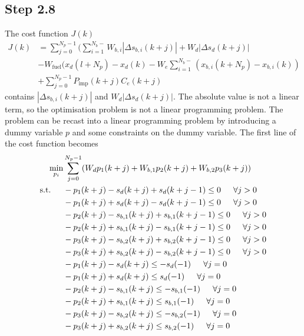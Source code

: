 \subsection*{Step 2.8}
The cost function $J(k)$ 
\begin{align*}
    J(k) &= \sum^{N_p-1}_{j=0} ( \sum^{N_b-}_{i=1}W_{b,i}|\Delta s_{b,i}(k+j)| + W_d|\Delta s_{d}(k+j)|\\
    &- W_{\text{fuel}}(x_d(l+N_p) - x_d(k) - W_e\sum^{N_b-}_{i=1}(x_{b,i}(k+N_p) - x_{b,i}(k))\\
    &+ \sum^{N_p-1}_{j=0} P_{\text{imp}}(k+j)C_e(k+j)
\end{align*}
contains $|\Delta s_{b,i}(k+j)|$ and $W_d|\Delta s_{d}(k+j)|$. The absolute value is not a linear term, so the optimisation problem is not a linear programming problem. The problem can be recast into a linear programming problem by introducing a dummy variable $p$ and some constraints on the dummy variable. The first line of the cost function becomes
\begin{align*}
   \min_{p_i} &\sum^{N_p-1}_{j=0} (W_dp_1(k+j) + W_{b,1}p_2(k+j) + W_{b,2}p_3(k+j))\\
   \text{s.t.} \indent& -p_1(k+j) - s_d(k+j) + s_d(k+j-1) \leq 0 \indent \forall j > 0\\
   & -p_1(k+j) + s_d(k+j) - s_d(k+j-1) \leq 0 \indent \forall j > 0\\
   & -p_{2}(k+j) - s_{b,1}(k+j) + s_{b,1}(k+j-1) \leq 0 \indent \forall j > 0\\
   & -p_{2}(k+j) + s_{b,1}(k+j) - s_{b,1}(k+j-1) \leq 0 \indent \forall j > 0\\
   & -p_{3}(k+j) - s_{b,2}(k+j) + s_{b,2}(k+j-1) \leq 0 \indent \forall j > 0\\
   & -p_{3}(k+j) + s_{b,2}(k+j) - s_{b,2}(k+j-1) \leq 0 \indent \forall j > 0\\
   & -p_1(k+j) - s_d(k+j)  \leq - s_d(-1) \indent \forall j = 0\\
   & -p_1(k+j) + s_d(k+j)  \leq s_d(-1) \indent \forall j = 0\\
   & -p_2(k+j) - s_{b,1}(k+j)  \leq - s_{b,1}(-1) \indent \forall j = 0\\
   & -p_2(k+j) + s_{b,1}(k+j)  \leq s_{b,1}(-1) \indent \forall j = 0\\
   & -p_3(k+j) - s_{b,2}(k+j)  \leq - s_{b,2}(-1) \indent \forall j = 0\\
   & -p_3(k+j) + s_{b,2}(k+j)  \leq s_{b,2}(-1) \indent \forall j = 0\\
\end{align*}

